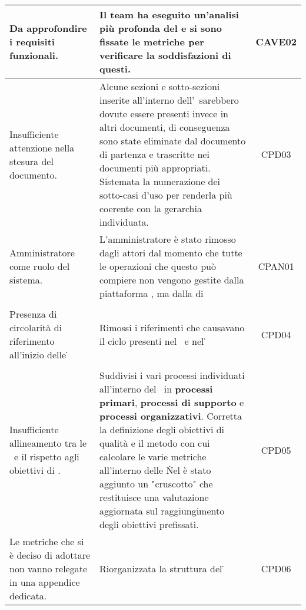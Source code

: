 \begin{longtable}{|C{4cm}|C{9cm}|c|}
		Da approfondire i requisiti funzionali. & Il team ha eseguito un'analisi più profonda del  e si sono fissate le metriche per verificare la soddisfazioni di questi. & CAVE02\\ \hline %
		Insufficiente attenzione nella stesura del documento. & Alcune sezioni e sotto-sezioni inserite all'interno dell'\AdR\ sarebbero dovute essere presenti invece in altri documenti, di conseguenza sono state eliminate dal documento di partenza e trascritte nei documenti più appropriati. Sistemata la numerazione dei sotto-casi d'uso per renderla più coerente con la gerarchia individuata. & CPD03\\ \hline %
		Amministratore come ruolo del sistema. & L'amministratore è stato rimosso dagli attori dal momento che tutte le operazioni che questo può compiere non vengono gestite dalla piattaforma \NomeProgetto, ma dalla  di  & CPAN01\\ \hline %
		\\ \hline
		Presenza di circolarità di riferimento all'inizio delle \NdP\. & Rimossi i riferimenti che causavano il ciclo presenti nel \PdP\ e nel \PdQ\. & CPD04\\ \hline %
		\\ \hline
		Insufficiente allineamento tra le \NdP\ e il \PdQ rispetto agli obiettivi di . & Suddivisi i vari processi individuati all'interno del \PdQ\ in \textbf{processi primari}, \textbf{processi di supporto} e \textbf{processi organizzativi}. Corretta la definizione degli obiettivi di qualità e il metodo con cui calcolare le varie metriche all'interno delle \NdP\. Nel \PdQ è stato aggiunto un "cruscotto" che restituisce una valutazione aggiornata sul raggiungimento degli obiettivi prefissati. & CPD05\\ \hline %
		Le metriche che si è deciso di adottare non vanno relegate in una appendice dedicata. & Riorganizzata la struttura del \PdQ\. & CPD06\\ \hline %
	\end{longtable}